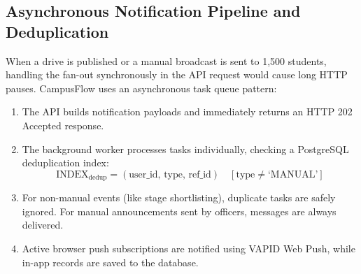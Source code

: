 \documentclass[conference]{IEEEtran}
\begin{document}
\subsection{Asynchronous Notification Pipeline and Deduplication}
When a drive is published or a manual broadcast is sent to 1,500 students, handling the fan-out synchronously in the API request would cause long HTTP pauses. CampusFlow uses an asynchronous task queue pattern:
\begin{enumerate}
    \item The API builds notification payloads and immediately returns an HTTP 202 Accepted response.
    \item The background worker processes tasks individually, checking a PostgreSQL deduplication index:
    \begin{equation}
    \mathrm{INDEX}_{\text{dedup}} = ( \text{user\_id},\, \text{type},\, \text{ref\_id} ) \quad [\text{type} \neq \text{`MANUAL'}]
    \end{equation}
    \item For non-manual events (like stage shortlisting), duplicate tasks are safely ignored. For manual announcements sent by officers, messages are always delivered.
    \item Active browser push subscriptions are notified using VAPID Web Push, while in-app records are saved to the database.
\end{enumerate}
\end{document}
